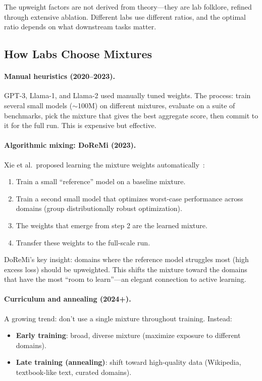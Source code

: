 The upweight factors are not derived from theory---they are lab folklore, refined through extensive ablation. Different labs use different ratios, and the optimal ratio depends on what downstream tasks matter.

\subsection{How Labs Choose Mixtures}
\label{sec:lab-mixtures}

\paragraph{Manual heuristics (2020--2023).} GPT-3, Llama-1, and Llama-2 used manually tuned weights. The process: train several small models ($\sim$100M) on different mixtures, evaluate on a suite of benchmarks, pick the mixture that gives the best aggregate score, then commit to it for the full run. This is expensive but effective.

\paragraph{Algorithmic mixing: DoReMi (2023).} Xie et al.\ proposed learning the mixture weights automatically~\cite{xie2023doremi}:
\begin{enumerate}[nosep]
  \item Train a small ``reference'' model on a baseline mixture.
  \item Train a second small model that optimizes worst-case performance across domains (group distributionally robust optimization).
  \item The weights that emerge from step 2 are the learned mixture.
  \item Transfer these weights to the full-scale run.
\end{enumerate}

DoReMi's key insight: domains where the reference model struggles most (high excess loss) should be upweighted. This shifts the mixture toward the domains that have the most ``room to learn''---an elegant connection to active learning.

\paragraph{Curriculum and annealing (2024+).} A growing trend: don't use a single mixture throughout training. Instead:
\begin{itemize}[nosep]
  \item \textbf{Early training}: broad, diverse mixture (maximize exposure to different domains).
  \item \textbf{Late training (annealing)}: shift toward high-quality data (Wikipedia, textbook-like text, curated domains).
\end{itemize}

